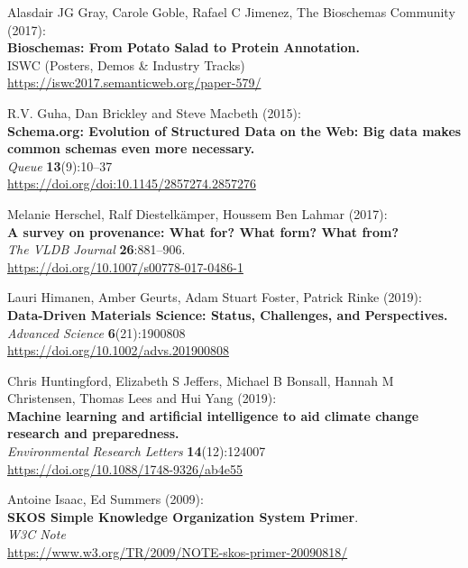 \documentclass[10pt,letterpaper]{article}
\begin{document}
\begin{thebibliography}{10}
\begin{small}
Alasdair JG Gray, Carole Goble, Rafael C Jimenez, The
Bioschemas Community (2017):\\
\textbf{Bioschemas: From Potato Salad to Protein Annotation.}\\
ISWC (Posters, Demos \& Industry Tracks)\\
\url{https://iswc2017.semanticweb.org/paper-579/}

R.V. Guha, Dan Brickley and Steve Macbeth (2015):\\
\textbf{Schema.org: Evolution of Structured Data on the Web: Big data makes common schemas even more necessary.}\\
\emph{Queue} \textbf{13}(9):10--37\\
\url{https://doi.org/doi:10.1145/2857274.2857276}

 Melanie Herschel, Ralf Diestelkämper, Houssem Ben Lahmar (2017):\\
\textbf{A survey on provenance: What for? What form? What from?}\\
\emph{The VLDB Journal} \textbf{26}:881--906.\\
\url{https://doi.org/10.1007/s00778-017-0486-1}

Lauri Himanen, Amber Geurts, Adam Stuart Foster, Patrick Rinke (2019):\\
\textbf{Data-Driven Materials Science: Status, Challenges, and Perspectives.}\\
\emph{Advanced Science} \textbf{6}(21):1900808\\
\url{https://doi.org/10.1002/advs.201900808}

 Chris Huntingford, Elizabeth S Jeffers, Michael B Bonsall, Hannah M Christensen, Thomas Lees and Hui Yang (2019):\\
\textbf{Machine learning and artificial intelligence to aid climate change research and preparedness.}\\
\emph{Environmental Research Letters} \textbf{14}(12):124007\\
\url{https://doi.org/10.1088/1748-9326/ab4e55}

Antoine Isaac, Ed Summers (2009):\\
\textbf{SKOS Simple Knowledge Organization System Primer}.\\
\emph{W3C Note}\\
\url{https://www.w3.org/TR/2009/NOTE-skos-primer-20090818/} 


\end{small}
\end{thebibliography}
\end{document}
